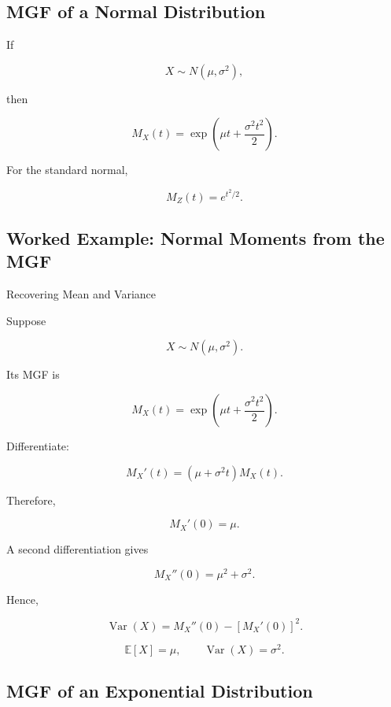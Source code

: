 \subsection{MGF of a Normal Distribution}
\label{subsec:mgf-normal}

If

\[
X\sim N(\mu,\sigma^2),
\]

then

\[
\boxed{
M_X(t)
=
\exp
\left(
\mu t
+
\frac{\sigma^2t^2}{2}
\right).
}
\]

For the standard normal,

\[
\boxed{
M_Z(t)
=
e^{t^2/2}.
}
\]

\subsection{Worked Example: Normal Moments from the MGF}
\label{subsec:worked-normal-mgf-moments}

\begin{workedexamplebox}{Recovering Mean and Variance}

Suppose

\[
X\sim N(\mu,\sigma^2).
\]

Its MGF is

\[
M_X(t)
=
\exp
\left(
\mu t+\frac{\sigma^2t^2}{2}
\right).
\]

Differentiate:

\[
M_X'(t)
=
(\mu+\sigma^2t)
M_X(t).
\]

Therefore,

\[
M_X'(0)=\mu.
\]

A second differentiation gives

\[
M_X''(0)
=
\mu^2+\sigma^2.
\]

Hence,

\[
\operatorname{Var}(X)
=
M_X''(0)
-
[M_X'(0)]^2.
\]

\begin{answerbox}
\[
\boxed{
\mathbb{E}[X]=\mu,
\qquad
\operatorname{Var}(X)=\sigma^2.
}
\]
\end{answerbox}

\end{workedexamplebox}

\subsection{MGF of an Exponential Distribution}
\label{subsec:mgf-exponential}

